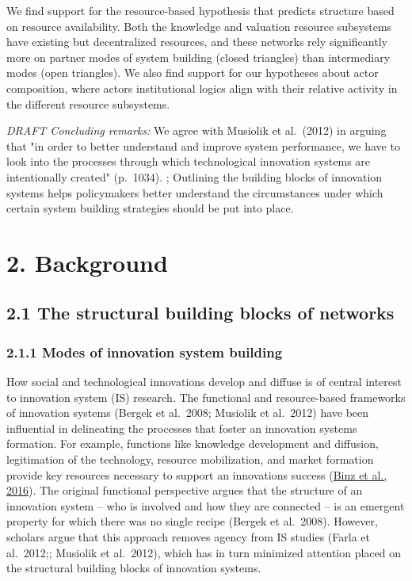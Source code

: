 \documentclass[twoside,12pt,final]{ucthesis-CA2012}
\begin{document}
\begin{ucmainmatter}
We find support for the resource-based hypothesis that predicts
structure based on resource availability. Both the knowledge and
valuation resource subsystems have existing but decentralized resources,
and these networks rely significantly more on \textquotesingle partner modes\textquotesingle{} of
system building (closed triangles) than intermediary modes (open
triangles). We also find support for our hypotheses about actor
composition, where actors\textquotesingle{} institutional logics align with their
relative activity in the different resource subsystems.

\emph{DRAFT Concluding remarks:} We agree with Musiolik et al.~(2012) in
arguing that "in order to better understand and improve system
performance, we have to look into the processes through which
technological innovation systems are intentionally created" (p.~1034).
; Outlining the building blocks of innovation systems helps policymakers
better understand the circumstances under which certain system building
strategies should be put into place.

\hypertarget{background-2}{%
\section{2. Background}\label{background-2}}

\hypertarget{the-structural-building-blocks-of-networks}{%
\subsection{2.1 The structural building blocks of networks}\label{the-structural-building-blocks-of-networks}}

\hypertarget{modes-of-innovation-system-building}{%
\subsubsection{2.1.1 Modes of innovation system building}\label{modes-of-innovation-system-building}}

How social and technological innovations develop and diffuse is of
central interest to innovation system (IS) research. The functional and
resource-based frameworks of innovation systems (Bergek et al.~2008;
Musiolik et al.~2012) have been influential in delineating the processes
that foster an innovation system\textquotesingle s formation. For example, functions
like knowledge development and diffusion, legitimation of the
technology, resource mobilization, and market formation provide key
resources necessary to support an innovation\textquotesingle s success (\href{https://www.zotero.org/google-docs/?Sy7y1y}{Binz et al.,
2016}). The original
functional perspective argues that the structure of an innovation system
-- who is involved and how they are connected -- is an emergent property
for which there was no single recipe (Bergek et al.~2008). However,
scholars argue that this approach removes agency from IS studies (Farla
et al.~2012;; Musiolik et al.~2012), which has in turn minimized
attention placed on the structural building blocks of innovation
systems.


\end{ucmainmatter}
\end{document}
